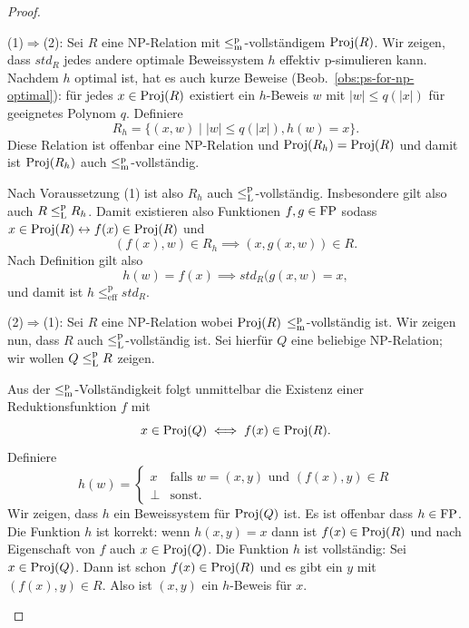\begin{proof}
    \begin{prooflist}[label={}]
    \item (1)$\Rightarrow$(2): 
        Sei $R$ eine NP-Relation mit $\leq_\mathrm{m}^\mathrm{p}$-vollständigem $\operatorname{Proj}(R)$.
    Wir zeigen, dass $\mathit{std}_{R}$ jedes andere optimale Beweissystem $h$ effektiv p-simulieren kann.
    Nachdem $h$ optimal ist, hat es auch kurze Beweise (Beob.~\ref{obs:ps-for-np-optimal}): für jedes $x\in\operatorname{Proj}(R)$ existiert ein $h$-Beweis $w$ mit $|w|\leq q(|x|)$ für geeignetes Polynom $q$.  Definiere
    \[ R_h = \{ (x, w) \mid |w|\leq q(|x|), h(w) = x\}. \]
    Diese Relation ist offenbar eine NP-Relation und $\operatorname{Proj}(R_h) = \operatorname{Proj}(R)$ und damit ist $\operatorname{Proj}(R_h)$ auch $\leq_\mathrm{m}^\mathrm{p}$-vollständig. 

    Nach Voraussetzung (1) ist also  $R_h$ auch $\leq_\mathrm{L}^\mathrm{p}$-vollständig.
    Insbesondere gilt also  auch $R \leq_\mathrm{L}^\mathrm{p} R_h$. Damit existieren also Funktionen $f,g\in\mathrm{FP}$ sodass
    $x\in \operatorname{Proj}(R) \leftrightarrow f(x)\in\operatorname{Proj}(R)$ und
    \[ (f(x), w) \in R_h \implies (x, g(x, w))\in R. \]
    Nach Definition gilt also 
    \[ h(w)=f(x) \implies \mathit{std}_R(g(x, w) = x, \]
    und damit ist $h\leq^\mathrm p_\mathrm{eff} \mathit{std}_R$.

\item (2)$\Rightarrow$(1): 
    Sei $R$ eine NP-Relation wobei $\operatorname{Proj}(R)$ $\leq_\mathrm{m}^\mathrm{p}$-vollständig ist. Wir zeigen nun, dass $R$ auch $\leq_\mathrm{L}^\mathrm{p}$-vollständig ist.
    Sei hierfür $Q$ eine beliebige NP-Relation; wir wollen $Q\leq_\mathrm{L}^\mathrm{p} R$ zeigen.

    Aus der $\leq_\mathrm{m}^\mathrm{p}$-Vollständigkeit folgt unmittelbar die Existenz einer Reduktionsfunktion $f$ mit 
    \[ x\in \operatorname{Proj}(Q) \iff f(x) \in \operatorname{Proj}(R). \]
    Definiere
    \[ h(w) = \begin{cases} x & \text{falls $w=(x,y)$ und $(f(x),y)\in R$} \\ \bot & \text{sonst.} \end{cases} \]
    Wir zeigen, dass $h$ ein Beweissystem für $\operatorname{Proj}(Q)$ ist. Es ist offenbar dass $h\in\mathrm{FP}$. Die Funktion $h$ ist korrekt: wenn $h(x,y)=x$ dann ist $f(x)\in\operatorname{Proj}(R)$ und nach Eigenschaft von $f$ auch $x\in\operatorname{Proj}(Q)$.
    Die Funktion $h$ ist vollständig: Sei $x\in\operatorname{Proj}(Q)$. Dann ist schon $f(x)\in\operatorname{Proj}(R)$ und es gibt ein $y$ mit $(f(x),y)\in R$. Also ist $(x,y)$ ein $h$-Beweis für $x$.


\end{prooflist}
\end{proof}
